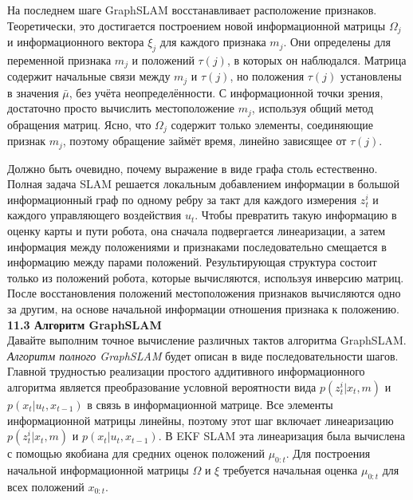 \documentclass[10pt,a4paper]{article}
\begin{document}
На последнем шаге GraphSLAM восстанавливает расположение признаков. Теоретически, это достигается построением новой информационной матрицы $\varOmega_j$ и информационного вектора $\xi_j$ для каждого признака $m_j$. Они определены для переменной признака $m_j$ и положений $\tau(j)$, в которых он наблюдался. Матрица содержит начальные связи между $m_j$ и $\tau(j)$, но положения $\tau(j)$ установлены в значения $\bar{\mu}$, без учёта неопределённости. С информационной точки зрения, достаточно просто вычислить местоположение $m_j$, используя общий метод обращения матриц. Ясно, что $\varOmega_j$ содержит только элементы, соединяющие признак $m_j$, поэтому обращение займёт время, линейно зависящее от $\tau(j)$.

Должно быть очевидно, почему выражение в виде графа столь естественно. Полная задача SLAM решается локальным добавлением информации в большой информационный граф по одному ребру за такт для каждого измерения $z_t^i$ и каждого управляющего воздействия $u_t$. Чтобы превратить такую информацию в оценку карты и пути робота, она сначала подвергается линеаризации, а затем информация между положениями и признаками последовательно смещается в информацию между парами положений. Результирующая структура состоит только из положений робота, которые вычисляются, используя инверсию матриц. После восстановления положений местоположения признаков вычисляются одно за другим, на основе начальной информации отношения признака к положению.\\

\textbf{11.3	Алгоритм GraphSLAM}\\

Давайте выполним точное вычисление различных тактов алгоритма GraphSLAM. \textit{Алгоритм полного GraphSLAM }будет описан в виде последовательности шагов. Главной трудностью реализации простого аддитивного информационного алгоритма является преобразование условной вероятности вида $p(z_t^i|x_t,m)$ и $p(x_t|u_t,x_{t-1})$ в связь в информационной матрице. Все элементы информационной матрицы линейны, поэтому этот шаг включает линеаризацию $p(z_t^i|x_t,m)$ и $p(x_t|u_t,x_{t-1})$. В EKF SLAM эта линеаризация была вычислена с помощью якобиана для средних оценок положений $\mu_{0:t}$. Для построения начальной информационной матрицы $\varOmega$ и $\xi$ требуется начальная оценка $\mu_{0:t}$ для всех положений $x_{0:t}$. 
\end{document}
